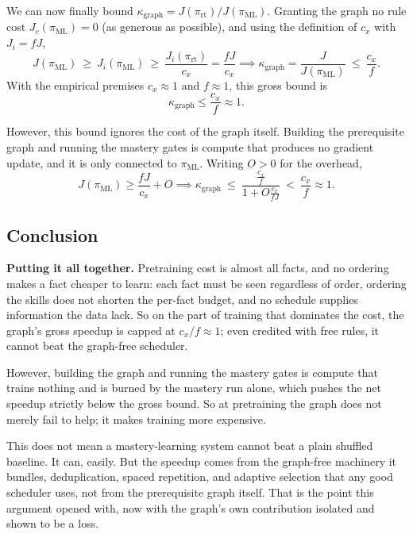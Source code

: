 \documentclass[11pt]{article}
\theoremstyle{plain}
\theoremstyle{definition}
\theoremstyle{remark}
\begin{document}
We can now finally bound $\kappa_{\mathrm{graph}}=J(\pi_{\mathrm{rt}})/J(\pi_{\mathrm{ML}})$. Granting
the graph no rule cost $J_c(\pi_{\mathrm{ML}})=0$ (as generous as possible), and using the definition
of $c_x$ with $J_i=fJ$,
\begin{equation*}
J(\pi_{\mathrm{ML}})\ \ge\ J_i(\pi_{\mathrm{ML}})\ \ge\ \frac{J_i(\pi_{\mathrm{rt}})}{c_x}
=\frac{fJ}{c_x} \implies 
\kappa_{\mathrm{graph}}=\frac{J}{J(\pi_{\mathrm{ML}})}\ \le\ \frac{c_x}{f}.
\end{equation*}
With the empirical premises $c_x\approx1$ and $f\approx1$, this gross bound is
\begin{equation*}
\kappa_{\mathrm{graph}}\le \frac{c_x}{f}\approx1.
\end{equation*}

However, this bound ignores the cost of the graph itself. Building the prerequisite graph and running the mastery gates
is compute that produces no gradient update, and it is only connected to $\pi_{\mathrm{ML}}$. Writing $O>0$
for the overhead, 
\begin{equation*}
J(\pi_{\mathrm{ML}})\ge \frac{fJ}{c_x} + O \implies 
\kappa_{\mathrm{graph}}\ \le\ \frac{\frac{c_x}{f}}{1+O\frac{c_x}{fJ}}\ <\ \frac{c_x}{f}\approx1.
\end{equation*}

\subsection{Conclusion}

\textbf{Putting it all together.} Pretraining cost is almost all facts, and no ordering makes a fact
cheaper to learn: each fact must be seen regardless of order, ordering the skills does not shorten
the per-fact budget, and no schedule supplies information the data lack. So on the part of training
that dominates the cost, the graph's gross speedup is capped at $c_x/f\approx1$; even credited with
free rules, it cannot beat the graph-free scheduler.

However, building the graph and running the mastery gates is compute that trains
nothing and is burned by the mastery run alone, which pushes the net speedup strictly below the
gross bound. So at pretraining the graph does not merely fail to help; it makes training more
expensive.

This does not mean a mastery-learning system cannot beat a plain shuffled baseline. It can, easily.
But the speedup comes from the graph-free machinery it bundles, deduplication, spaced repetition,
and adaptive selection that any good scheduler uses, not from the prerequisite graph itself. That is
the point this argument opened with, now with the graph's own contribution isolated and shown to be
a loss.
\end{document}
